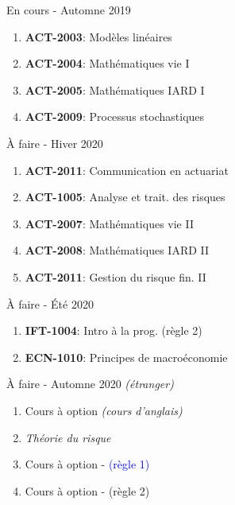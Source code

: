 \documentclass[9pt, french]{article}
\begin{document}
\begin{multicols*}{3}
\vfill\null 
\columnbreak


\medskip

\begin{algo3}{En cours - Automne 2019}
\begin{enumerate}
	\item[] \textbf{ACT-2003}: Modèles linéaires                                 
	\item[] \textbf{ACT-2004}: Mathématiques vie I       
	\item[] \textbf{ACT-2005}: Mathématiques IARD I     
	\item[] \textbf{ACT-2009}: Processus stochastiques 
\end{enumerate}
\end{algo3}

\bigskip

\begin{algo3}{À faire - Hiver 2020}
\begin{enumerate}
	\item[] \textbf{ACT-2011}: Communication en actuariat                            
	\item[] \textbf{ACT-1005}: Analyse et trait. des risques    
	\item[] \textbf{ACT-2007}: Mathématiques vie II
	\item[] \textbf{ACT-2008}: Mathématiques IARD II 
	\item[] \textbf{ACT-2011}: Gestion du risque fin. II 	
\end{enumerate}
\end{algo3}

\bigskip

\begin{algo3}{À faire - Été 2020}
\begin{enumerate}
	\item[] \textbf{IFT-1004}: Intro à la prog. \textcolor{brass}{(règle 2)}                                 
	\item[] \textbf{ECN-1010}: Principes de macroéconomie                             
\end{enumerate}
\end{algo3}

\vfill\null 
\columnbreak



\medskip

\begin{algo2}{À faire - Automne 2020 \textit{(étranger)}}
\begin{enumerate}
	\item[] Cours à option \textit{(cours d'anglais)}
	\item[] \textit{Théorie du risque}
	\item[] Cours à option - \textcolor{blue}{(règle 1)} 
	\item[] Cours à option - \textcolor{brass}{(règle 2)} 
\end{enumerate}
\end{algo2}



\end{multicols*}
\end{document}
